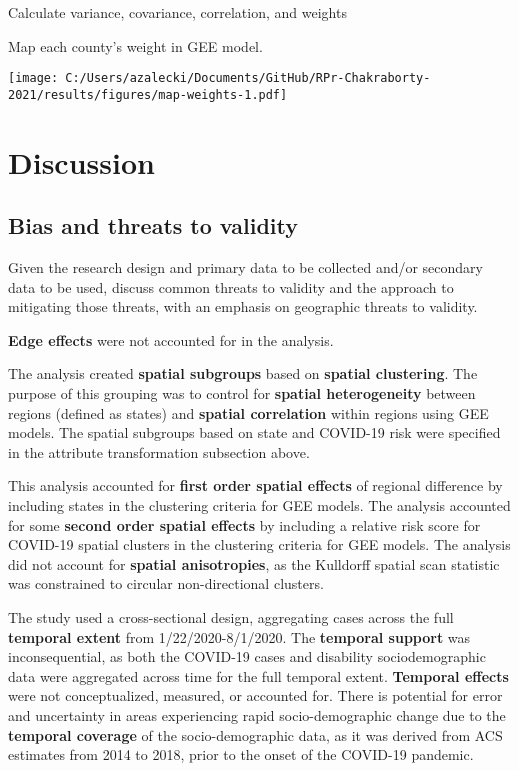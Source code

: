 \documentclass[
]{article}
\begin{document}
Calculate variance, covariance, correlation, and weights

Map each county's weight in GEE model.

\texttt{[image: C:/Users/azalecki/Documents/GitHub/RPr-Chakraborty-2021/results/figures/map-weights-1.pdf]}

\hypertarget{discussion}{%
\section{Discussion}\label{discussion}}

\hypertarget{bias-and-threats-to-validity}{%
\subsection{Bias and threats to
validity}\label{bias-and-threats-to-validity}}

Given the research design and primary data to be collected and/or
secondary data to be used, discuss common threats to validity and the
approach to mitigating those threats, with an emphasis on geographic
threats to validity.

\textbf{Edge effects} were not accounted for in the analysis.

The analysis created \textbf{spatial subgroups} based on \textbf{spatial
clustering}. The purpose of this grouping was to control for
\textbf{spatial heterogeneity} between regions (defined as states) and
\textbf{spatial correlation} within regions using GEE models. The
spatial subgroups based on state and COVID-19 risk were specified in the
attribute transformation subsection above.

This analysis accounted for \textbf{first order spatial effects} of
regional difference by including states in the clustering criteria for
GEE models. The analysis accounted for some \textbf{second order spatial
effects} by including a relative risk score for COVID-19 spatial
clusters in the clustering criteria for GEE models. The analysis did not
account for \textbf{spatial anisotropies}, as the Kulldorff spatial scan
statistic was constrained to circular non-directional clusters.

The study used a cross-sectional design, aggregating cases across the
full \textbf{temporal extent} from 1/22/2020-8/1/2020. The
\textbf{temporal support} was inconsequential, as both the COVID-19
cases and disability sociodemographic data were aggregated across time
for the full temporal extent. \textbf{Temporal effects} were not
conceptualized, measured, or accounted for. There is potential for error
and uncertainty in areas experiencing rapid socio-demographic change due
to the \textbf{temporal coverage} of the socio-demographic data, as it
was derived from ACS estimates from 2014 to 2018, prior to the onset of
the COVID-19 pandemic.
\end{document}
